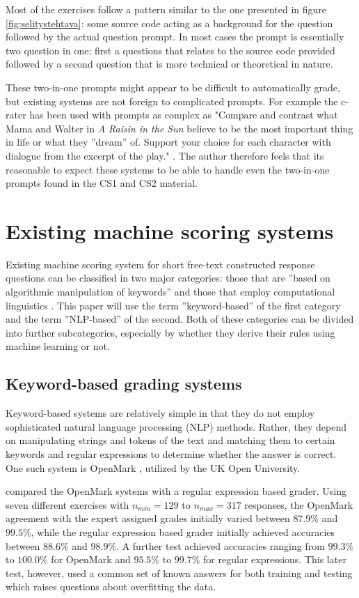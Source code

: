 \documentclass[english]{tktltiki2}
\theoremstyle{definition}
\theoremstyle{remark}
\begin{document}
Most of the exercises follow a pattern similar to the one presented in figure \ref{fig:selitystehtava}: some source code acting as a background for the question followed by the actual question prompt. In most cases the prompt is essentially two question in one: first a questions that relates to the source code provided followed by a second question that is more technical or theoretical in nature.

These two-in-one prompts might appear to be difficult to automatically grade, but existing systems are not foreign to complicated prompts. For example the c-rater \cite{leacock03} has been used with prompts as complex as "Compare and contrast what Mama and Walter in \emph{A Raisin in the Sun} believe to be the most important thing in life or what they ''dream'' of. Support your choice for each character with dialogue from the excerpt of the play." \cite{leacock03}. The author therefore feels that its reasonable to expect these systems to be able to handle even the two-in-one prompts found in the CS1 and CS2 material.


\section{Existing machine scoring systems}

Existing machine scoring system for short free-text constructed response questions can be classified in two major categories: those that are ''based on algorithmic manipulation of keywords'' \cite{butcher10} and those that employ computational linguistics . This paper will use the term ''keyword-based'' of the first category and the term ''NLP-based'' of the second. Both of these categories can be divided into further subcategories, especially by whether they derive their rules using machine learning or not.

\subsection{Keyword-based grading systems}

Keyword-based systems are relatively simple in that they do not employ sophisticated natural language processing (NLP) methods. Rather, they depend on manipulating strings and tokens of the text and matching them to certain keywords and regular expressions to determine whether the answer is correct. One such system is OpenMark \cite{butcher06}, utilized by the UK Open University.

\cite{butcher10} compared the OpenMark systems with a regular expression based grader. Using seven different exercises with $n_{min} = 129$ to $n_{max} = 317$ responses, the OpenMark agreement with the expert assigned grades initially varied between $87.9\%$ and $99.5\%$, while the regular expression based grader initially  achieved accuracies between $88.6\%$ and $98.9\%$. A further test achieved accuracies ranging from $99.3\%$ to $100.0\%$ for OpenMark and $95.5\%$ to $99.7\%$ for regular expressions. This later test, however, used a common set of known answers for both training and testing which raises questions about overfitting the data.
\end{document}
